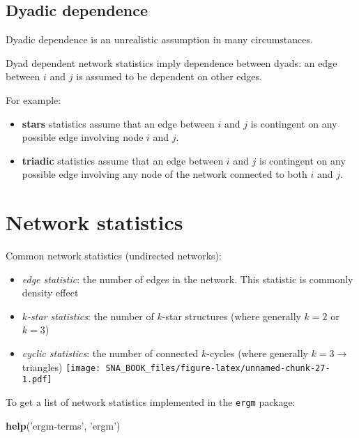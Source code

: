 \documentclass[]{book}
\newenvironment{Shaded}{\begin{snugshade}}{\end{snugshade}}
\newcommand{\KeywordTok}[1]{\textcolor[rgb]{0.13,0.29,0.53}{\textbf{{#1}}}}
\newcommand{\StringTok}[1]{\textcolor[rgb]{0.31,0.60,0.02}{{#1}}}
\newcommand{\NormalTok}[1]{{#1}}
\providecommand{\tightlist}{%
  \setlength{\itemsep}{0pt}\setlength{\parskip}{0pt}}
\begin{document}
\subsection{Dyadic dependence}\label{dyadic-dependence}

Dyadic dependence is an unrealistic assumption in many circumstances.

Dyad dependent network statistics imply dependence between dyads: an
edge between \(i\) and \(j\) is assumed to be dependent on other edges.

For example:

\begin{itemize}
\tightlist
\item
  \textbf{stars} statistics assume that an edge between \(i\) and \(j\)
  is contingent on any possible edge involving node \(i\) and \(j\).
\item
  \textbf{triadic} statistics assume that an edge between \(i\) and
  \(j\) is contingent on any possible edge involving any node of the
  network connected to both \(i\) and \(j\).
\end{itemize}

\section{Network statistics}\label{network-statistics-1}

Common network statistics (undirected networks):

\begin{itemize}
\item
  \emph{edge statistic}: the number of edges in the network. This
  statistic is commonly density effect
\item
  \emph{\(k\)-star statistics}: the number of \(k\)-star structures
  (where generally \(k = 2\) or \(k = 3\))
\item
  \emph{cyclic statistics}: the number of connected \(k\)-cycles (where
  generally \(k = 3 \rightarrow\) triangles)
  \texttt{[image: SNA\_BOOK\_files/figure-latex/unnamed-chunk-27-1.pdf]}
\end{itemize}

To get a list of network statistics implemented in the \texttt{ergm}
package:

\begin{Shaded}
\begin{Highlighting}[]
\KeywordTok{help}\NormalTok{(}\StringTok{'ergm-terms'}\NormalTok{, }\StringTok{'ergm'}\NormalTok{)}
\end{Highlighting}
\end{Shaded}
\end{document}
